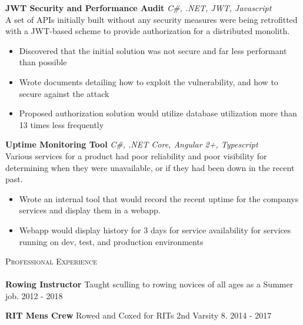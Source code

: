 \documentclass[a4paper]{article}
\newcommand{\lineunder} {
    \vspace*{-8pt} \\
    \hspace*{-18pt} \hrulefill \\
}
\newcommand{\header} [1] {
    {\hspace*{-18pt}\vspace*{6pt} \textsc{#1}}
    \vspace*{-6pt} \lineunder
}
\begin{document}
\begin{addmargin}[1em]{2em}%
{\textbf{JWT Security and Performance Audit}} {\sl C\#, .NET, JWT, Javascript} \\
A set of APIs initially built without any security measures were being retrofitted with a JWT-based scheme to provide authorization for a distributed monolith.
\vspace*{-2mm}
\begin{itemize}[leftmargin=4.5mm] \itemsep -1mm
	\item Discovered that the initial solution was not secure and far less performant than possible
	\item Wrote documents detailing how to exploit the vulnerability, and how to secure against the attack%
    \item Proposed authorization solution would utilize database utilization more than 13 times less frequently
\end{itemize}
\vspace*{2mm}

{\textbf{Uptime Monitoring Tool}} {\sl C\#, .NET Core, Angular 2+, Typescript} \\
Various services for a product had poor reliability and poor visibility for determining when they were unavailable, or if they had been down in the recent past.
\vspace*{-2mm}
\begin{itemize}[leftmargin=4.5mm] \itemsep -1mm 
	\item Wrote an internal tool that would record the recent uptime for the company\textquotesingle{}s services and display them in a webapp.\\
    \item Webapp would display history for 3 days for service availability for services running on dev, test, and production environments
\end{itemize}
\vspace*{2mm}
\end{addmargin}


\header{Professional Experience}
\textbf{Rowing Instructor}
Taught sculling to rowing novices of all ages as a Summer job. \hfill 2012 - 2018\\
\vspace*{2mm}

\textbf{RIT Men\textquotesingle{}s Crew}
Rowed and Coxed for RIT\textquotesingle{}s 2nd Varsity 8. \hfill  2014 - 2017\\
\vspace*{2mm}
\end{document}
